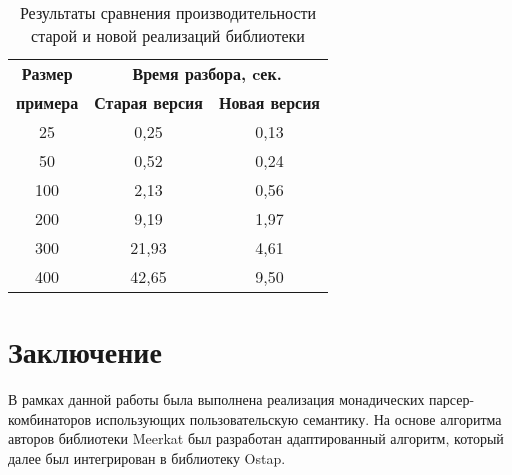 \documentclass[conference]{IEEEtran}
\begin{document}
\begin{table}[htbp]
\begin{center}
\begin{tabular}{|c|c|c|}
\hline
\textbf{Размер} & \multicolumn{2}{|c|}{\textbf{Время разбора, cек.}} \\
\cline{2-3} 
\textbf{примера} & \textbf{Старая версия} & \textbf{Новая версия} \\
\hline
25& 0,25& 0,13 \\
\hline
50& 0,52& 0,24 \\
\hline
100& 2,13& 0,56 \\
\hline
200& 9,19& 1,97 \\
\hline
300& 21,93& 4,61 \\
\hline
400& 42,65& 9,50 \\
\hline
\end{tabular}
\vskip3mm
\caption{Результаты сравнения производительности старой и новой реализаций библиотеки}
\label{tab1}
\end{center}
\end{table}


\section{Заключение}

В рамках данной работы была выполнена реализация монадических парсер-комбинаторов использующих пользовательскую семантику. На основе алгоритма авторов библиотеки Meerkat был
разработан адаптированный алгоритм, который далее был интегрирован в библиотеку Ostap. 
\end{document}
